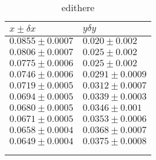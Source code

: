 \begin{longtable}{@{}ll@{}}
\toprule
$x \pm \delta x$ & $y \delta y$ \tabularnewline
\midrule
$0.0855 \pm 0.0007$ & $0.020 \pm 0.002$ \tabularnewline
$0.0806 \pm 0.0007$ & $0.025 \pm 0.002$ \tabularnewline
$0.0775 \pm 0.0006$ & $0.025 \pm 0.002$ \tabularnewline
$0.0746 \pm 0.0006$ & $0.0291 \pm 0.0009$ \tabularnewline
$0.0719 \pm 0.0005$ & $0.0312 \pm 0.0007$ \tabularnewline
$0.0694 \pm 0.0005$ & $0.0339 \pm 0.0003$ \tabularnewline
$0.0680 \pm 0.0005$ & $0.0346 \pm 0.001$ \tabularnewline
$0.0671 \pm 0.0005$ & $0.0353 \pm 0.0006$ \tabularnewline
$0.0658 \pm 0.0004$ & $0.0368 \pm 0.0007$ \tabularnewline
$0.0649 \pm 0.0004$ & $0.0375 \pm 0.0008$ \tabularnewline
\bottomrule
\label{tab:edithere}
\\
\caption{edithere}
\end{longtable}
